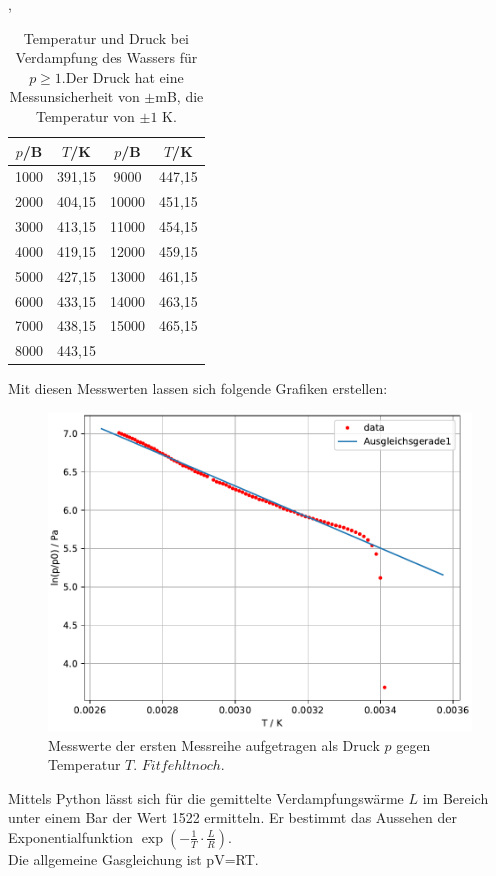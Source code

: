\begin{table}
  \centering
  \caption{Temperatur und Druck bei Verdampfung des Wassers für $p\geq 1$.Der Druck hat eine Messunsicherheit von
  $\pm$mB, die Temperatur von $\pm 1$ K.},
  \label{tab:Messreihe_2}
\begin{tabular}{
  c c||c c
}
\toprule 
$p$/B & $T$/K & $p$/B & $T$/K\\
\midrule
1000  & 391,15 & 9000  & 447,15\\
2000  & 404,15 & 10000 & 451,15\\
3000  & 413,15 & 11000 & 454,15\\
4000  & 419,15 & 12000 & 459,15\\
5000  & 427,15 & 13000 & 461,15\\
6000  & 433,15 & 14000 & 463,15\\
7000  & 438,15 & 15000 & 465,15\\
8000  & 443,15 &       &       \\
\bottomrule
\end{tabular}
\end{table}

Mit diesen Messwerten lassen sich folgende Grafiken erstellen:
\begin{figure}
  \centering
  \includegraphics[width=\textwidth]{plot_simon1.pdf}
  \caption{Messwerte der ersten Messreihe aufgetragen als Druck $p$ 
  gegen Temperatur $T$. $Fit fehlt noch$.}
\end{figure}
Mittels Python lässt sich für die gemittelte Verdampfungswärme $L$ im Bereich unter einem Bar der Wert
1522 ermitteln. Er bestimmt das Aussehen der Exponentialfunktion $\exp(-\frac{1}{T}\cdot\frac{L}{R})$.
\\
Die allgemeine Gasgleichung ist pV=RT. 
